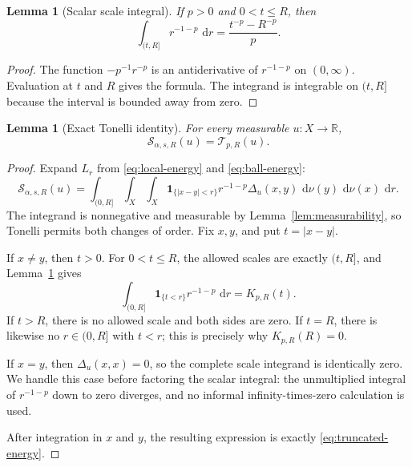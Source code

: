 \documentclass[11pt]{article}
\newtheorem{lemma}[theorem]{Lemma}
\theoremstyle{remark}
\newcommand{\dd}{\,\mathrm{d}}
\newcommand{\ind}{\mathbf{1}}
\newcommand{\Senergy}{\mathcal S}
\newcommand{\Tenergy}{\mathcal T}
\begin{document}
\begin{lemma}[Scalar scale integral]                                      \label{lem:scalar-scale}
If \(p>0\) and \(0<t\leq R\), then
\[
  \int_{(t,R]}r^{-1-p}\,\dd r
  =
  \frac{t^{-p}-R^{-p}}{p}.
\]
\end{lemma}

\begin{proof}
The function \(-p^{-1}r^{-p}\) is an antiderivative of
\(r^{-1-p}\) on \((0,\infty)\).  Evaluation at \(t\) and \(R\) gives the
formula.  The integrand is integrable on \((t,R]\) because the interval is
bounded away from zero.
\end{proof}

\begin{lemma}[Exact Tonelli identity]                                     \label{lem:tonelli}
For every measurable \(u:X\to\mathbb R\),
\begin{equation}
  \Senergy_{\alpha,s,R}(u)
  =
  \Tenergy_{p,R}(u).                                                       \label{eq:tonelli-identity}
\end{equation}
\end{lemma}

\begin{proof}
Expand \(L_r\) from \eqref{eq:local-energy} and
\eqref{eq:ball-energy}:
\[
  \Senergy_{\alpha,s,R}(u)
  =
  \int_{(0,R]}\int_X\int_X
  \ind_{\{\lvert x-y\rvert<r\}}
  r^{-1-p}\Delta_u(x,y)
  \,\dd\nu(y)\,\dd\nu(x)\,\dd r.
\]
The integrand is nonnegative and measurable by
Lemma~\ref{lem:measurability}, so Tonelli permits both changes of order.
Fix \(x,y\), and put \(t=\lvert x-y\rvert\).

If \(x\neq y\), then \(t>0\).  For \(0<t\leq R\), the allowed scales are
exactly \((t,R]\), and Lemma~\ref{lem:scalar-scale} gives
\[
  \int_{(0,R]}
  \ind_{\{t<r\}}r^{-1-p}\,\dd r
  =
  K_{p,R}(t).
\]
If \(t>R\), there is no allowed scale and both sides are zero.  If \(t=R\),
there is likewise no \(r\in(0,R]\) with \(t<r\); this is precisely why
\(K_{p,R}(R)=0\).

If \(x=y\), then \(\Delta_u(x,x)=0\), so the complete scale integrand is
identically zero.  We handle this case before factoring the scalar
integral: the unmultiplied integral of \(r^{-1-p}\) down to zero diverges,
and no informal infinity-times-zero calculation is used.

After integration in \(x\) and \(y\), the resulting expression is exactly
\eqref{eq:truncated-energy}.
\end{proof}
\end{document}
